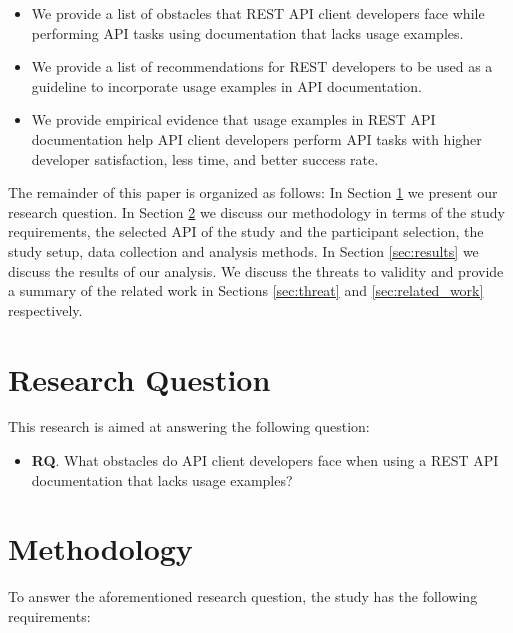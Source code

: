 \documentclass[conference]{IEEEtran}
\begin{document}
\begin{itemize}
  \item We provide a list of obstacles that REST API client developers face while performing API tasks using documentation that lacks usage examples.
  \item We provide a list of recommendations for REST developers to be used as a guideline to incorporate usage examples in API documentation.
  \item We provide empirical evidence that usage examples in REST API documentation help API client developers perform API tasks with higher developer satisfaction, less time, and better success rate.
\end{itemize}

The remainder of this paper is organized as follows: In Section \ref{sec:goal} we present our research question. In Section \ref{sec:method} we discuss our methodology in terms of the study requirements, the selected API of the study and the participant selection, the study setup, data collection and analysis methods. In Section \ref{sec:results} we discuss the results of our analysis. We discuss the threats to validity and provide a summary of the related work in Sections \ref{sec:threat} and  \ref{sec:related_work} respectively.

\section{Research Question}
\label{sec:goal}
This research is aimed at answering the following question:

\begin{itemize}
  \item \textbf{RQ}. What obstacles do API client developers face when using a REST API documentation that lacks usage examples?
\end{itemize}

\section{Methodology} %
\label{sec:method}

To answer the aforementioned research question, the study has the following requirements:
\end{document}
